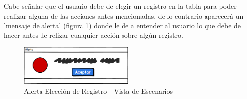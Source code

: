Cabe señalar que el usuario debe de elegir un registro en la tabla para poder realizar alguna de las acciones antes mencionadas, de lo contrario aparecerá un 'mensaje de alerta' (figura \ref{fig:Alerta - Vista de Escenarios}) donde le de a entender al usuario lo que debe de hacer antes de relizar cualquier acción sobre algún registro.
\begin{figure}[!h]
	\centering
	\includegraphics[width=0.5\textwidth]{./diseno/vescenarios/imagenes/alerta}
	\caption{Alerta Elección de Registro - Vista de Escenarios}
	\label{fig:Alerta - Vista de Escenarios}
\end{figure}
\clearpage
